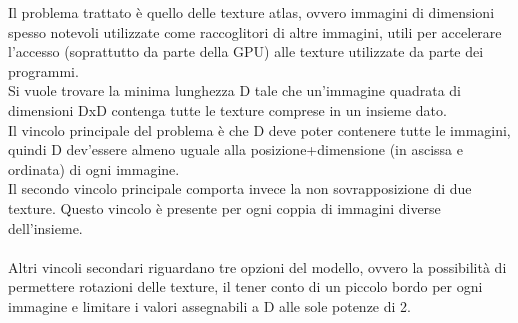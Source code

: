 Il problema trattato è quello delle texture atlas, ovvero immagini di dimensioni spesso notevoli utilizzate come raccoglitori di altre immagini, utili per accelerare l’accesso (soprattutto da parte della GPU) alle texture utilizzate da parte dei programmi. \\
Si vuole trovare la minima lunghezza D tale che un’immagine quadrata di dimensioni DxD contenga tutte le texture comprese in un insieme dato. \\
Il vincolo principale del problema è che D deve poter contenere tutte le immagini, quindi D dev’essere almeno uguale alla posizione+dimensione (in ascissa e ordinata) di ogni immagine. \\
Il secondo vincolo principale comporta invece la non sovrapposizione di due texture. Questo vincolo è presente per ogni coppia di immagini diverse dell’insieme. \\
\ \\
Altri vincoli secondari riguardano tre opzioni del modello, ovvero la possibilità di permettere rotazioni delle texture, il tener conto di un piccolo bordo per ogni immagine e limitare i valori assegnabili a D alle sole potenze di 2.


\newpage

